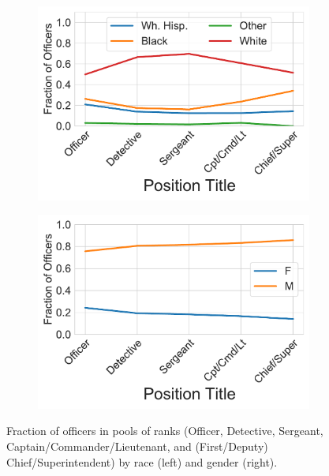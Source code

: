 \begin{figure}[ht!] 
	\begin{center}
\begin{subfigure}{0.47\textwidth}
\includegraphics[width=\textwidth]{figs/position_race} 
\end{subfigure}
\hfill
\begin{subfigure}{0.47\textwidth}
\includegraphics[width=\textwidth]{figs/position_gender} 
\end{subfigure}
	\end{center}
	\caption{Fraction of officers in pools of ranks (Officer, Detective, Sergeant, Cap\-tain/Com\-mander/Lieutenant, and (First/Deputy) Chief/Superintendent)
 by race (left) and gender (right).} \label{fig:position}
\end{figure}

